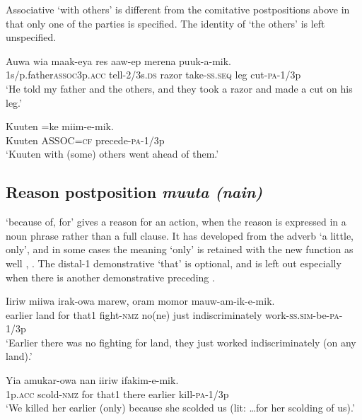 Associative  `with others' is different from the comitative postpositions above in that only one of the parties is specified. The identity of `the others' is left unspecified.

\ea%
\label{ex:3:x826}
\gll Auwa  wia maak-eya res aaw-ep merena puuk-a-mik.\\
1s/p.father\textsc{assoc}3p.\textsc{acc} tell-2/3s.\textsc{ds} razor take-\textsc{ss}.\textsc{seq} leg cut-\textsc{pa}-1/3p\\
\glt`He told my father and the others, and they took a razor and made a cut on his leg.'
\z

\ea%
\label{ex:3:x827}
\gll Kuuten =ke miim-e-mik. \\
Kuuten ASSOC=\textsc{cf} precede-\textsc{pa}-1/3p\\
\glt`Kuuten with (some) others went ahead of them.'
\z

\subsection{Reason postposition \textit{muuta (nain)}}
{}
 `because of, for' gives a reason for an action, when the reason is expressed in a noun phrase rather than a full clause. It has developed from the adverb  `a little, only', and in some cases the meaning `only' is retained with the new function as well , . The distal-1 demonstrative  `that' is optional, and is left out especially when there is another demonstrative  preceding  .

\ea%
\label{ex:3:x756}
\gll Iiriw miiwa   irak-owa marew, oram momor mauw-am-ik-e-mik.\\
earlier land for that1 fight-\textsc{nmz} no(ne) just indiscriminately work-\textsc{ss}.\textsc{sim}-be-\textsc{pa}-1/3p\\
\glt`Earlier there was no fighting for land, they just worked indiscriminately (on any land).'
\z

\ea%
\label{ex:3:x1876}
\gll Yia amukar-owa   nan iiriw ifakim-e-mik. \\
1p.\textsc{acc} scold-\textsc{nmz} for that1 there earlier kill-\textsc{pa}-1/3p\\
\glt`We killed her earlier (only) because she scolded us (lit: {\dots}for her scolding of us).'
\z


